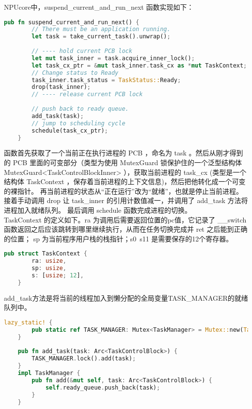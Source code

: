 NPUcore中，suspend\_current\_and\_run\_next 函数实现如下：
\begin{lstlisting}[language={Rust}, label={code:suspend current and run next}, caption={suspend current and run next}]
	pub fn suspend_current_and_run_next() {
		// There must be an application running.
		let task = take_current_task().unwrap();
		
		// ---- hold current PCB lock
		let mut task_inner = task.acquire_inner_lock();
		let task_cx_ptr = &mut task_inner.task_cx as *mut TaskContext;
		// Change status to Ready
		task_inner.task_status = TaskStatus::Ready;
		drop(task_inner);
		// ---- release current PCB lock
		
		// push back to ready queue.
		add_task(task);
		// jump to scheduling cycle
		schedule(task_cx_ptr);
	}
\end{lstlisting}

函数首先获取了一个当前正在执行进程的 PCB ，命名为 task 。然后从刚才得到的 PCB 里面的可变部分（类型为使用 MutexGuard 锁保护住的一个泛型结构体
MutexGuard<TaskControlBlockInner> ），获取当前进程的 task\_cx (类型是一个结构体 TaskContext ，保存着当前进程的上下文信息)，然后把他转化成一个可变的裸指针。
再当前进程的状态从“正在运行”改为“就绪”，也就是停止当前进程。接着手动调用 drop 让 task\_inner 的引用计数值减一，并调用了 add\_task 方法将进程加入就绪队列。
最后调用 schedule 函数完成进程的切换。\\

TaskContext 的定义如下。ra 为调用后需要返回位置的pc值，它记录了 \_\_switch 函数返回之后应该跳转到哪里继续执行，从而在任务切换完成并 ret 之后能到正确的位置；
sp 为当前程序用户栈的栈指针；s0~s11 是需要保存的12个寄存器。
\begin{lstlisting}[language={Rust}, label={code:TaskContext}, caption={TaskContext}]
	pub struct TaskContext {
		ra: usize,
		sp: usize,
		s: [usize; 12],
	}
\end{lstlisting}

add\_task方法是将当前的线程加入到懒分配的全局变量TASK\_MANAGER的就绪队列中。
\begin{lstlisting}[language={Rust}, label={code:add task}, caption={add task}]
	lazy_static! {
		pub static ref TASK_MANAGER: Mutex<TaskManager> = Mutex::new(TaskManager::new());
	}
	
	pub fn add_task(task: Arc<TaskControlBlock>) {
		TASK_MANAGER.lock().add(task);
	}
	impl TaskManager {
		pub fn add(&mut self, task: Arc<TaskControlBlock>) {
			self.ready_queue.push_back(task);
		}
	}
\end{lstlisting}

